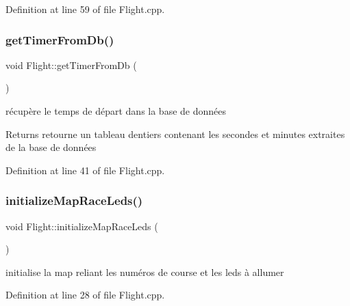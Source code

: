 Definition at line 59 of file Flight.\+cpp.

\mbox{\label{class_flight_afab0d1a975b5165b7aba0844b7122eb9}} 
\subsubsection{\texorpdfstring{get\+Timer\+From\+Db()}{getTimerFromDb()}}
{\footnotesize\ttfamily void Flight\+::get\+Timer\+From\+Db (\begin{DoxyParamCaption}{ }\end{DoxyParamCaption})}



récupère le temps de départ dans la base de données 

\begin{DoxyReturn}{Returns}
retourne un tableau d\textquotesingle{}entiers contenant les secondes et minutes extraites de la base de données 
\end{DoxyReturn}


Definition at line 41 of file Flight.\+cpp.

\mbox{\label{class_flight_a8dbcde73f89d46cfeeb9e5892c1c7400}} 
\subsubsection{\texorpdfstring{initialize\+Map\+Race\+Leds()}{initializeMapRaceLeds()}}
{\footnotesize\ttfamily void Flight\+::initialize\+Map\+Race\+Leds (\begin{DoxyParamCaption}{ }\end{DoxyParamCaption})}



initialise la map reliant les numéros de course et les leds à allumer 



Definition at line 28 of file Flight.\+cpp.

\mbox{\label{class_flight_a84fa12f82e85f6e708249d6a634c5923}} 
